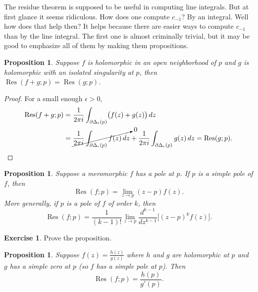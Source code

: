 \documentclass[12pt,openany]{book}
\theoremstyle{plain}
\newtheorem{prop}[thm]{Proposition}
\theoremstyle{remark}
\theoremstyle{definition}
\newenvironment{exbox}{%
    \def\FrameCommand{\vrule width 1pt \relax\hspace{10pt}}%
    \MakeFramed{\advance\hsize-\width\FrameRestore}%
}{%
    \endMakeFramed
}
\theoremstyle{exercise}
\newtheorem{exercise}{Exercise}[section]
\theoremstyle{example}
\begin{document}
The residue theorem is supposed to be useful in computing line integrals.
But at first glance it seems ridiculous.  How does one compute $c_{-1}$?  By
an integral.  Well how does that help then?  It helps because there are
easier ways to compute $c_{-1}$ than by the line integral.  The first one is
almost criminally trivial, but it may be good to emphasize all of them
by making them propositions.

\begin{prop}
Suppose $f$ is holomorphic in an open neighborhood of $p$ and $g$ is holomorphic
with an isolated singularity at $p$, then
$\operatorname{Res}(f+g;p) = \operatorname{Res}(g;p)$.
\end{prop}

\begin{proof}
For a small enough $\epsilon > 0$,
\begin{equation*}
\begin{split}
\operatorname{Res}(f+g;p)
& =
\frac{1}{2\pi i}
\int_{\partial \Delta_{\epsilon}(p)}
\bigl(f(z)+g(z)\bigr) \, dz
\\
& =
\cancelto{0}{
\frac{1}{2\pi i}
\int_{\partial \Delta_{\epsilon}(p)}
f(z) \, dz
}
+
\frac{1}{2\pi i}
\int_{\partial \Delta_{\epsilon}(p)}
g(z) \, dz
=
\operatorname{Res}(g;p) . \qedhere
\end{split}
\end{equation*}
\end{proof}

\begin{prop}
Suppose a meromorphic $f$ has a pole at $p$.
If $p$ is a simple pole of $f$, then
\begin{equation*}
\operatorname{Res}(f;p) = \lim_{z\to p} (z-p) f(z) .
\end{equation*}
More generally, if $p$ is a pole of $f$ of order $k$, then
\begin{equation*}
\operatorname{Res}(f;p) = \frac{1}{(k-1)!} \lim_{z\to p}
\frac{d^{k-1}}{dz^{k-1}}\bigl[ (z-p)^{k} f(z) \bigr] .
\end{equation*}
\end{prop}

\begin{exbox}
\begin{exercise}
Prove the proposition.
\end{exercise}
\end{exbox}

\begin{prop} \label{prop:residuesimpleratio}
Suppose $f(z) = \frac{h(z)}{g(z)}$ where $h$ and $g$ are holomorphic
at $p$ and $g$ has a simple zero at $p$ (so $f$ has a simple pole at $p$).
Then
\begin{equation*}
\operatorname{Res}(f;p) = \frac{h(p)}{g'(p)} .
\end{equation*}
\end{prop}
\end{document}
